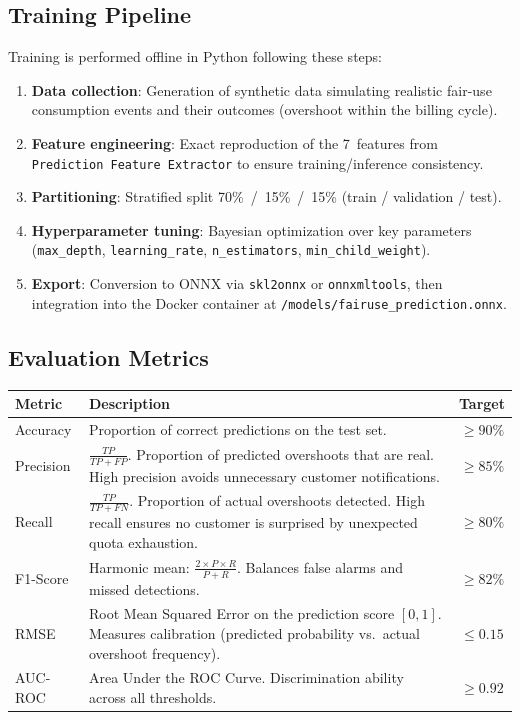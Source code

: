 \subsection{Training Pipeline}

Training is performed offline in Python following these steps:

\begin{enumerate}
    \item \textbf{Data collection}: Generation of synthetic data simulating realistic fair-use consumption events and their outcomes (overshoot within the billing cycle).
    \item \textbf{Feature engineering}: Exact reproduction of the 7~features from \texttt{Prediction Feature Extractor} to ensure training/inference consistency.
    \item \textbf{Partitioning}: Stratified split 70\%~/~15\%~/~15\% (train / validation / test).
    \item \textbf{Hyperparameter tuning}: Bayesian optimization over key parameters \\ (\texttt{max\_depth}, \texttt{learning\_rate}, \texttt{n\_estimators}, \texttt{min\_child\_weight}).
    \item \textbf{Export}: Conversion to ONNX via \texttt{skl2onnx} or \texttt{onnxmltools}, then integration into the Docker container at \texttt{/models/fairuse\_prediction.onnx}.
\end{enumerate}

\subsection{Evaluation Metrics}

\begin{center}
    \justifying
    \begin{tabularx}{\textwidth}{|l|X|c|}
\toprule
\textbf{Metric} & \textbf{Description} & \textbf{Target} \\
\midrule
Accuracy &
Proportion of correct predictions on the test set. &
$\geq 90\%$ \\
\hline
Precision &
$\frac{TP}{TP + FP}$. Proportion of predicted overshoots that are real.
High precision avoids unnecessary customer notifications. &
$\geq 85\%$ \\
\hline
Recall &
$\frac{TP}{TP + FN}$. Proportion of actual overshoots detected.
High recall ensures no customer is surprised by unexpected quota exhaustion. &
$\geq 80\%$ \\
\hline
F1-Score &
Harmonic mean: $\frac{2 \times P \times R}{P + R}$.
Balances false alarms and missed detections. &
$\geq 82\%$ \\
\hline
RMSE &
Root Mean Squared Error on the prediction score $[0, 1]$.
Measures calibration (predicted probability vs.\ actual overshoot frequency). &
$\leq 0.15$ \\
\hline
AUC-ROC &
Area Under the ROC Curve. Discrimination ability across all thresholds. &
$\geq 0.92$ \\
\bottomrule
    \end{tabularx}
    \label{tab:metrics}
\end{center}

